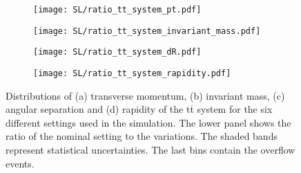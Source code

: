 \begin{figure}[H]
    \centering
    \begin{subfigure}{0.49\textwidth}
        \centering
        \texttt{[image: SL/ratio\_tt\_system\_pt.pdf]}
        \caption{}
        \label{app:subfig:pt(ttbar)_SL}
    \end{subfigure}
    \begin{subfigure}{0.49\textwidth}
        \centering
        \texttt{[image: SL/ratio\_tt\_system\_invariant\_mass.pdf]}
        \caption{}
        \label{app:subfig:m(ttbar_SL}
    \end{subfigure}

    \vspace{0.2cm}
    
    \begin{subfigure}{0.49\textwidth}
        \centering
        \texttt{[image: SL/ratio\_tt\_system\_dR.pdf]}
        \caption{}
        \label{app:subfig:dR(ttbar)_SL}
    \end{subfigure}
    \begin{subfigure}{0.49\textwidth}
        \centering
        \texttt{[image: SL/ratio\_tt\_system\_rapidity.pdf]}
        \caption{}
        \label{app:subfig:y(ttbar)_SL}
    \end{subfigure}
    \caption{Distributions of (a) transverse momentum, (b) invariant mass,  (c) angular separation and (d) rapidity of the t$\overline{\text{t}}$ system for the six different settings used in the simulation. The lower panel shows the ratio of the nominal setting to the variations. The shaded bands represent statistical uncertainties. The last bins contain the overflow events.}
    \label{app:fig:ttbar_SL}
\end{figure}


